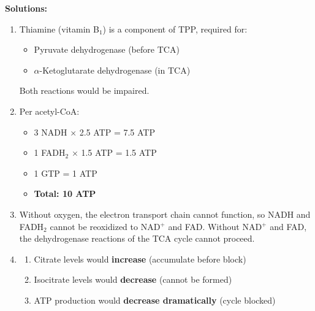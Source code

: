 \textbf{Solutions:}
\begin{enumerate}
    \item Thiamine (vitamin B$_1$) is a component of TPP, required for:
    \begin{itemize}
        \item Pyruvate dehydrogenase (before TCA)
        \item $\alpha$-Ketoglutarate dehydrogenase (in TCA)
    \end{itemize}
    Both reactions would be impaired.
    
    \item Per acetyl-CoA:
    \begin{itemize}
        \item 3 NADH $\times$ 2.5 ATP = 7.5 ATP
        \item 1 FADH$_2$ $\times$ 1.5 ATP = 1.5 ATP
        \item 1 GTP = 1 ATP
        \item \textbf{Total: 10 ATP}
    \end{itemize}
    
    \item Without oxygen, the electron transport chain cannot function, so NADH and FADH$_2$ cannot be reoxidized to NAD$^+$ and FAD. Without NAD$^+$ and FAD, the dehydrogenase reactions of the TCA cycle cannot proceed.
    
    \item \begin{enumerate}
        \item Citrate levels would \textbf{increase} (accumulate before block)
        \item Isocitrate levels would \textbf{decrease} (cannot be formed)
        \item ATP production would \textbf{decrease dramatically} (cycle blocked)
    \end{enumerate}
\end{enumerate}

